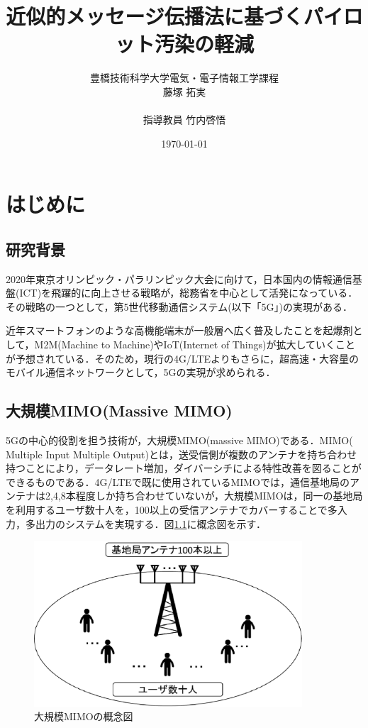 \documentclass[report]{jsbook}
\title{近似的メッセージ伝播法に基づくパイロット汚染の軽減}
\author{豊橋技術科学大学電気・電子情報工学課程\\藤塚 拓実\\\\指導教員 竹内啓悟\\}
\date{\today}
\begin{document}
\maketitle


\tableofcontents
\newpage
\chapter{はじめに}
\section{研究背景}
2020年東京オリンピック・パラリンピック大会に向けて，日本国内の情報通信基盤(ICT)を飛躍的に向上させる戦略が，総務省を中心として活発になっている．その戦略の一つとして，第5世代移動通信システム(以下「5G」)の実現がある\cite{soumu_suzuki}．

近年スマートフォンのような高機能端末が一般層へ広く普及したことを起爆剤として，M2M(Machine to Machine)やIoT(Internet of Things)が拡大していくことが予想されている．そのため，現行の4G/LTEよりもさらに，超高速・大容量のモバイル通信ネットワークとして，5Gの実現が求められる\cite{suyama}．

\section{大規模MIMO(Massive MIMO)}
5Gの中心的役割を担う技術が，大規模MIMO(massive MIMO)である．MIMO( Multiple Input Multiple Output)とは，送受信側が複数のアンテナを持ち合わせ持つことにより，データレート増加，ダイバーシチによる特性改善を図ることができるものである\cite{goldsmith}．4G/LTEで既に使用されているMIMOでは，通信基地局のアンテナは2,4,8本程度しか持ち合わせていないが，大規模MIMOは，同一の基地局を利用するユーザ数十人を，100以上の受信アンテナでカバーすることで多入力，多出力のシステムを実現する\cite{emil}\cite{Vidit}．図\ref{fig:mimo}に概念図を示す．
\begin{figure}[htbp]
  \begin{center}
    \includegraphics[clip,width=10.0cm]{./mimo.eps}
    \caption{大規模MIMOの概念図}
    \label{fig:mimo}
  \end{center}
\end{figure}
\end{document}
